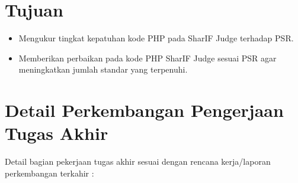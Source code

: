 \documentclass[a4paper,twoside]{article}
\begin{document}
	\section{Tujuan}
	\begin{itemize}
		\item Mengukur tingkat kepatuhan kode PHP pada SharIF Judge terhadap PSR.
		\item Memberikan perbaikan pada kode PHP SharIF Judge sesuai PSR agar meningkatkan jumlah standar yang terpenuhi.
	\end{itemize}
	
	
	\section{Detail Perkembangan Pengerjaan Tugas Akhir}
	Detail bagian pekerjaan tugas akhir sesuai dengan rencana kerja/laporan perkembangan terkahir :
\end{document}
